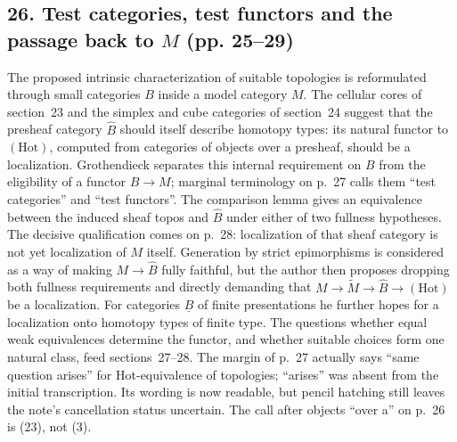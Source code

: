 \subsection*{26. Test categories, test functors and the passage back to $M$ (pp. 25--29)}
The proposed intrinsic characterization of suitable topologies is reformulated through small categories $B$ inside a model category $M$. The cellular cores of section~23 and the simplex and cube categories of section~24 suggest that the presheaf category $\widehat B$ should itself describe homotopy types: its natural functor to $(\mathrm{Hot})$, computed from categories of objects over a presheaf, should be a localization. Grothendieck separates this internal requirement on $B$ from the eligibility of a functor $B\to M$; marginal terminology on p.~27 calls them ``test categories'' and ``test functors''. The comparison lemma gives an equivalence between the induced sheaf topos and $\widehat B$ under either of two fullness hypotheses. The decisive qualification comes on p.~28: localization of that sheaf category is not yet localization of $M$ itself. Generation by strict epimorphisms is considered as a way of making $M\to\widehat B$ fully faithful, but the author then proposes dropping both fullness requirements and directly demanding that $M\to\widetilde M\to\widehat B\to(\mathrm{Hot})$ be a localization. For categories $\underline B$ of finite presentations he further hopes for a localization onto homotopy types of finite type. The questions whether equal weak equivalences determine the functor, and whether suitable choices form one natural class, feed sections~27--28. The margin of p.~27 actually says ``same question arises'' for Hot-equivalence of topologies; ``arises'' was absent from the initial transcription. Its wording is now readable, but pencil hatching still leaves the note's cancellation status uncertain. The call after objects ``over a'' on p.~26 is (23), not (3).

